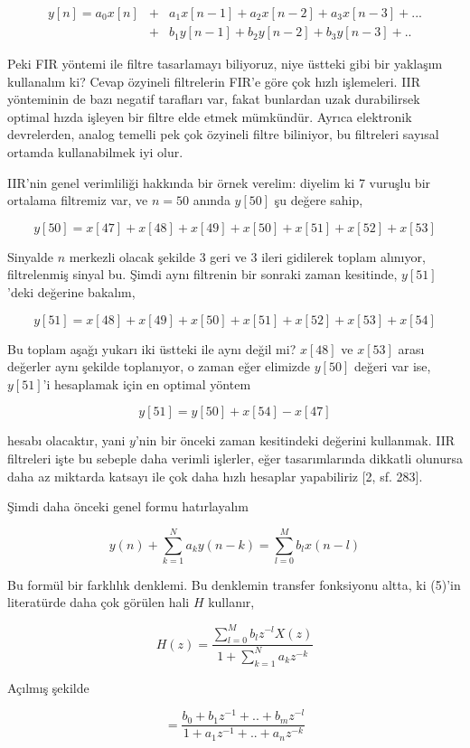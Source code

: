 \documentclass[12pt,fleqn]{article}\usepackage{../../common}
\begin{document}
\begin{eqnarray*}
y[n] = a_0 x[n] &+& a_1 x[n-1] + a_2 x[n-2] +  a_3 x[n-3] + ...  \\
 &+& b_1 y[n-1] + b_2 y[n-2] + b_3 y[n-3] + ..
\end{eqnarray*}

Peki FIR yöntemi ile filtre tasarlamayı biliyoruz, niye üstteki gibi bir
yaklaşım kullanalım ki? Cevap özyineli filtrelerin FIR'e göre çok hızlı
işlemeleri. IIR yönteminin de bazı negatif tarafları var, fakat bunlardan
uzak durabilirsek optimal hızda işleyen bir filtre elde etmek
mümkündür. Ayrıca elektronik devrelerden, analog temelli pek çok özyineli
filtre biliniyor, bu filtreleri sayısal ortamda kullanabilmek iyi olur.

IIR'nin genel verimliliği hakkında bir örnek verelim: diyelim ki 7 vuruşlu
bir ortalama filtremiz var, ve $n=50$ anında $y[50]$ şu değere sahip,

$$ y[50] = x[47] + x[48] + x[49] + x[50] + x[51] + x[52] + x[53] $$

Sinyalde $n$ merkezli olacak şekilde 3 geri ve 3 ileri gidilerek toplam
alınıyor, filtrelenmiş sinyal bu. Şimdi aynı filtrenin bir sonraki zaman
kesitinde, $y[51]$'deki değerine bakalım,

$$ y[51] = x[48] + x[49] + x[50] + x[51] + x[52] + x[53] + x[54] $$

Bu toplam aşağı yukarı iki üstteki ile aynı değil mi? $x[48]$ ve $x[53]$
arası değerler aynı şekilde toplanıyor, o zaman eğer elimizde $y[50]$
değeri var ise, $y[51]$'i hesaplamak için en optimal yöntem

$$ y[51] = y[50] + x[54] - x[47]$$

hesabı olacaktır, yani $y$'nin bir önceki zaman kesitindeki değerini
kullanmak. IIR filtreleri işte bu sebeple daha verimli işlerler, eğer
tasarımlarında dikkatli olunursa daha az miktarda katsayı ile çok daha
hızlı hesaplar yapabiliriz [2, sf. 283].

Şimdi daha önceki genel formu hatırlayalım 

$$ y(n) + \sum_{k=1}^N a_k y(n-k) = \sum_{l=0}^M b_l x(n-l) $$

Bu formül bir farklılık denklemi. Bu denklemin transfer fonksiyonu
altta, ki (5)'in literatürde daha çok görülen hali $H$ kullanır,

$$ 
H(z)  = \frac{\sum_{l=0}^M b_l z^{-l}X(z) }{ 1 + \sum_{k=1}^Na_kz^{-k}} 
$$

Açılmış şekilde  

$$ 
= \frac
{b_0 + b_1 z^{-1} + .. + b_m z^{-l}}
{1 + a_1 z^{-1} + .. + a_n z^{-k}}
$$
\end{document}
